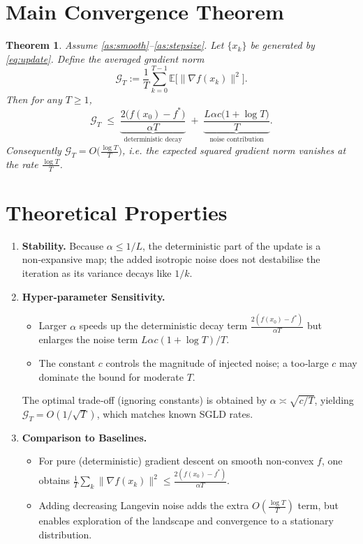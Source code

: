\documentclass{article}
\newtheorem{theorem}{Theorem}
\newcommand{\E}{\mathbb{E}}
\begin{document}
\section*{Main Convergence Theorem}
\begin{theorem}\label{thm:main}
Assume \ref{as:smooth}–\ref{as:stepsize}. Let $\{x_{k}\}$ be generated by \eqref{eq:update}. Define the averaged gradient norm
\[
\mathcal G_{T}:=\frac{1}{T}\sum_{k=0}^{T-1}\E\bigl[\|\nabla f(x_{k})\|^{2}\bigr].
\]
Then for any $T\ge 1$,
\begin{equation}
\mathcal G_{T}\;\le\;
\underbrace{\frac{2\bigl(f(x_{0})-f^{*}\bigr)}{\alpha T}}_{\text{deterministic decay}}
\;+\;
\underbrace{\frac{L\alpha c\bigl(1+\log T\bigr)}{T}}_{\text{noise contribution}}.
\label{eq:rate}
\end{equation}
Consequently $\mathcal G_{T}=O\!\bigl(\tfrac{\log T}{T}\bigr)$, i.e. the expected squared gradient norm vanishes at the rate $\tfrac{\log T}{T}$.
\end{theorem}

\section*{Theoretical Properties}
\begin{enumerate}[label=\arabic*.]
\item \textbf{Stability.} Because $\alpha\le1/L$, the deterministic part of the update is a non‑expansive map; the added isotropic noise does not destabilise the iteration as its variance decays like $1/k$.

\item \textbf{Hyper‑parameter Sensitivity.}
    \begin{itemize}
        \item Larger $\alpha$ speeds up the deterministic decay term $\frac{2(f(x_{0})-f^{*})}{\alpha T}$ but enlarges the noise term $L\alpha c(1+\log T)/T$.
        \item The constant $c$ controls the magnitude of injected noise; a too‑large $c$ may dominate the bound for moderate $T$.
    \end{itemize}
    The optimal trade‑off (ignoring constants) is obtained by $\alpha\asymp\sqrt{c/T}$, yielding $\mathcal G_{T}=O(1/\sqrt{T})$, which matches known SGLD rates.

\item \textbf{Comparison to Baselines.}
    \begin{itemize}
        \item For pure (deterministic) gradient descent on smooth non‑convex $f$, one obtains $\frac{1}{T}\sum_{k}\|\nabla f(x_{k})\|^{2}\le \frac{2(f(x_{0})-f^{*})}{\alpha T}$.
        \item Adding decreasing Langevin noise adds the extra $O(\frac{\log T}{T})$ term, but enables exploration of the landscape and convergence to a stationary distribution.
    \end{itemize}
\end{enumerate}
\end{document}
